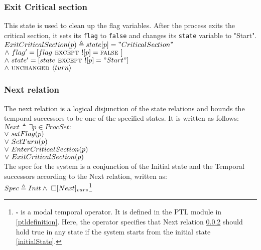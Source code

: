 \documentclass[fleqn]{tukseminar}
\begin{document}
			\subsubsection{Exit Critical section}
			This state is used to clean up the flag variables. After the process exits the critical section, it
			sets its \lstinline|flag| to \lstinline|false| and changes its \lstinline|state| variable to "Start".\\
			
			$ ExitCriticalSection(p) \triangleq state[p] = "CriticalSection"$ \\
			\hspace*{0.8cm}$\land \   flag' = [flag \mbox{\textsc{ except }} ![p] = \mbox{\textsc{false }}]$\\
			\hspace*{0.8cm}$\land \   state' = [state \mbox{\textsc{ except }} ![p] = "Start"]$\\
			\hspace*{0.8cm}$\land \  \mbox{\textsc{unchanged }} \langle turn \rangle $
			
			\subsubsection{Next relation}\label{nextRelation}
			The next relation is a logical disjunction of the state relations and bounds the temporal successors to be one of the specified states. It is written as follows:\\
			
			$Next \triangleq \exists p \in ProcSet:$\\
			\hspace*{0.8cm}$ \lor \  setFlag(p)$\\
			\hspace*{0.8cm}$ \lor \  SetTurn(p)$\\
			\hspace*{0.8cm}$ \lor \  EnterCriticalSection(p)$\\
			\hspace*{0.8cm}$ \lor \  ExitCriticalSection(p)$\\
			
			The spec for the system is a conjunction of the Initial state and the Temporal successors according to the Next relation, written as:\\
	
			$Spec \triangleq Init \land \  \square [Next]_{vars}$\footnote{$\square$ is a modal temporal operator. It is defined in the PTL module in \tla \ref{ptldefinition}. Here, the operator specifies that Next relation \ref{nextRelation} should hold true in any state if the system starts from the initial state \ref{initialState}.}
\end{document}
